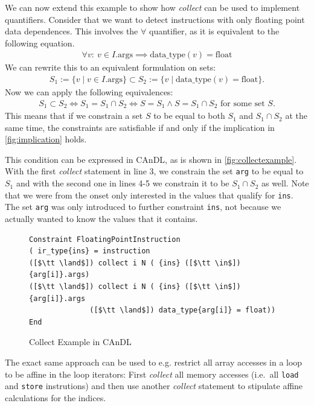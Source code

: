    We can now extend this example to show how {\it collect} can be used to
    implement quantifiers.
    Consider that we want to detect instructions with only floating point data
    dependences.
    This involves the $\forall$ quantifier, as it is equivalent to
    the following equation.
    \begin{align}
        \forall v\colon\ v\in I.\text{args}\implies\text{data\_type}(v)=\text{float}
    \label{fig:implication}
    \end{align}
    We can rewrite this to an equivalent formulation on sets:
    \begin{align*}
        S_1:= \{v\mid v\in I.\text{args}\}\subset S_2:={}\{v\mid\text{data\_type}(v)=\text{float}\}.
    \end{align*}
    Now we can apply the following equivalences:
    \begin{align*}
        S_1\subset S_2\iff S_1 = S_1\cap S_2\iff S=S_1\land S=S_1\cap S_2\text{ for some set }S.
    \end{align*}
    This means that if we constrain a set $S$ to be equal to both $S_1$ and
    $S_1\cap S_2$ at the same time, the constraints are satisfiable if and only
    if the implication in \autoref{fig:implication} holds.

    This condition can be expressed in CAnDL, as is shown in
    \autoref{fig:collectexample}.
    With the first {\it collect} statement in line 3, we constrain the set
    \texttt{arg} to be equal to $S_1$ and with the second one in lines 4-5 we
    constrain it to be $S_1\cap S_2$ as well.
    Note that we were from the onset only interested in the values that qualify
    for \texttt{ins}.
    The set \texttt{arg} was only introduced to further constraint \texttt{ins},
    not because we actually wanted to know the values that it contains.

\begin{figure}[ht]
\begin{lstlisting}[language=CAnDL]
Constraint FloatingPointInstruction
( ir_type{ins} = instruction
([$\tt \land$]) collect i N ( {ins} ([$\tt \in$]) {arg[i]}.args)
([$\tt \land$]) collect i N ( {ins} ([$\tt \in$]) {arg[i]}.args
              ([$\tt \land$]) data_type{arg[i]} = float))
End
\end{lstlisting}
\vspace{-0.3cm}
\caption{Collect Example in CAnDL}
\label{fig:collectexample}
\end{figure}

    The exact same approach can be used to e.g. restrict all array accesses in a
    loop to be affine in the loop iterators:
    First {\it collect} all memory accesses
    (i.e.\ all \texttt{load} and \texttt{store} instrutions) and then use
    another {\it collect} statement to stipulate affine calculations for the
    indices.

